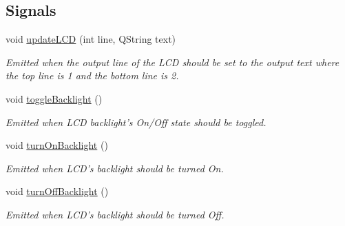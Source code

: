 \subsection*{Signals}
\begin{DoxyCompactItemize}
\item 
\hypertarget{class_menu_ae31aac661b1be50022bb6ef105330573}{void \hyperlink{class_menu_ae31aac661b1be50022bb6ef105330573}{update\-L\-C\-D} (int line, Q\-String text)}\label{class_menu_ae31aac661b1be50022bb6ef105330573}

\begin{DoxyCompactList}\small\item\em Emitted when the output line of the L\-C\-D should be set to the output text where the top line is 1 and the bottom line is 2. \end{DoxyCompactList}\item 
\hypertarget{class_menu_aa35b1ddd8bd823d70262d8c9d6357dc5}{void \hyperlink{class_menu_aa35b1ddd8bd823d70262d8c9d6357dc5}{toggle\-Backlight} ()}\label{class_menu_aa35b1ddd8bd823d70262d8c9d6357dc5}

\begin{DoxyCompactList}\small\item\em Emitted when L\-C\-D backlight's On/\-Off state should be toggled. \end{DoxyCompactList}\item 
\hypertarget{class_menu_a1b94ca8578185fc490c0e8bba50305f2}{void \hyperlink{class_menu_a1b94ca8578185fc490c0e8bba50305f2}{turn\-On\-Backlight} ()}\label{class_menu_a1b94ca8578185fc490c0e8bba50305f2}

\begin{DoxyCompactList}\small\item\em Emitted when L\-C\-D's backlight should be turned On. \end{DoxyCompactList}\item 
\hypertarget{class_menu_a6bb95c088d59c52597a40c0d941ea575}{void \hyperlink{class_menu_a6bb95c088d59c52597a40c0d941ea575}{turn\-Off\-Backlight} ()}\label{class_menu_a6bb95c088d59c52597a40c0d941ea575}

\begin{DoxyCompactList}\small\item\em Emitted when L\-C\-D's backlight should be turned Off. \end{DoxyCompactList}\end{DoxyCompactItemize}
